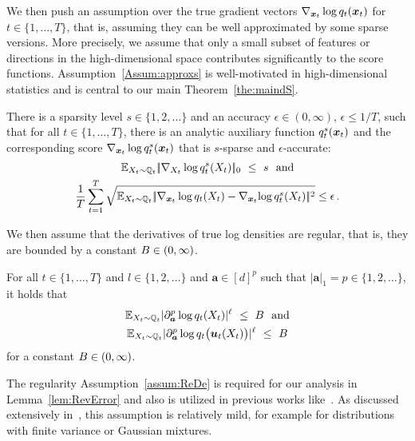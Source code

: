 We then push an assumption over the true gradient vectors $\nabla_{\textcolor{black}{\boldsymbol{x}}_t}\log q_t(\textcolor{black}{\boldsymbol{x}}_t)$ for $t\in \{1,\dots,T\}$, that is, assuming they can be well approximated by some sparse versions.
More precisely, we assume that only a small subset of features or directions in the high-dimensional space contributes significantly to the score functions.
Assumption~\ref{Assum:approxs} is well-motivated in high-dimensional statistics and is central to our main Theorem~\ref{the:maindS}. 
\begin{assumption}[Sparsity]\label{Assum:approxs}
There is a sparsity level $s\in\{1,2,\dots\}$ and an accuracy $\epsilon\in(0,\infty)$, 
$\epsilon\leq1/T$,
such that for all $t \in \{1,\dots,T\}$, there is an analytic auxiliary function $q^s_t(\textcolor{black}{\boldsymbol{x}}_t)$ and the corresponding score 
$\nabla_{\textcolor{black}{\boldsymbol{x}}_t}\log q_t^s(\textcolor{black}{\boldsymbol{x}}_t)$ that is $s$-sparse and $\epsilon$-accurate:
\begin{multline*}
\textcolor{black}{\mathbb{E}}_{X_t \sim \mathbb{Q}_t}|\!|\nabla_{X_t}\log q_t^s(X_t)|\!|_0~\leq~s~~\text{and} \\
\frac{1}{T} \sum_{t=1}^T
   \sqrt{\textcolor{black}{\mathbb{E}}_{X_t \sim \mathbb{Q}_t} |\!|\nabla_{\textcolor{black}{\boldsymbol{x}}_t}\log q_t(X_t) - \nabla_{\textcolor{black}{\boldsymbol{x}}_t}\!\log q^s_t(X_t)|\!|^2}\leq\epsilon\,.
\end{multline*}
\end{assumption}


We then assume that the derivatives of true log densities are regular, that is, they are bounded by a constant $B\in (0,\infty)$.
\begin{assumption}\label{assum:ReDe}
For all $t \in \{1,\dots,T\}$ and $l\in \{1,2,\dots\}$ and $\boldsymbol{a}\in [d]^p$ such that $|\boldsymbol{a}|_1=p\in \{1,2,\dots\}$, it holds that
\begin{multline*}
    \textcolor{black}{\mathbb{E}}_{X_t\sim \mathbb{Q}_t}|\partial^p_{\boldsymbol{a}}\log q_t(X_t)|^\ell~\le~B~~\text{and} \\
    \textcolor{black}{\mathbb{E}}_{X_t\sim \mathbb{Q}_t}|\partial^p_{\boldsymbol{a}}\log q_t\bigl(\boldsymbol{u}_t(X_t)\bigr)|^\ell~\le~B 
\end{multline*}
 for a constant $B\in (0,\infty)$.    
\end{assumption}
The regularity Assumption~\ref{assum:ReDe} is required for our analysis in Lemma~\ref{lem:RevError} and  also is utilized in previous works like~\citet{huang2024convergence}. As discussed extensively in~\citet[Section~5]{liang2024nonN}, this assumption is relatively mild, for example for distributions with finite variance or   Gaussian mixtures. 




